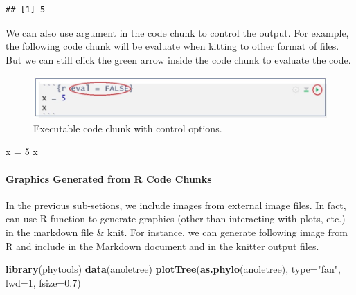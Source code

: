 \documentclass[
]{article}
\newenvironment{Shaded}{\begin{snugshade}}{\end{snugshade}}
\newcommand{\AttributeTok}[1]{\textcolor[rgb]{0.13,0.29,0.53}{#1}}
\newcommand{\DecValTok}[1]{\textcolor[rgb]{0.00,0.00,0.81}{#1}}
\newcommand{\FloatTok}[1]{\textcolor[rgb]{0.00,0.00,0.81}{#1}}
\newcommand{\FunctionTok}[1]{\textcolor[rgb]{0.13,0.29,0.53}{\textbf{#1}}}
\newcommand{\NormalTok}[1]{#1}
\newcommand{\OtherTok}[1]{\textcolor[rgb]{0.56,0.35,0.01}{#1}}
\newcommand{\StringTok}[1]{\textcolor[rgb]{0.31,0.60,0.02}{#1}}
\begin{document}
\begin{verbatim}
## [1] 5
\end{verbatim}

We can also use argument in the code chunk to control the output. For
example, the following code chunk will be evaluate when kitting to other
format of files. But we can still click the green arrow inside the code
chunk to evaluate the code.

\begin{figure}

{\centering \includegraphics[width=12.21in]{img/Executable-code-chunk-argument} 

}

\caption{Executable code chunk with control options.}\label{fig:unnamed-chunk-6}
\end{figure}

\begin{Shaded}
\begin{Highlighting}[]
\NormalTok{x }\OtherTok{=} \DecValTok{5}
\NormalTok{x}
\end{Highlighting}
\end{Shaded}

\hypertarget{graphics-generated-from-r-code-chunks}{%
\paragraph{Graphics Generated from R Code
Chunks}\label{graphics-generated-from-r-code-chunks}}

In the previous sub-setions, we include images from external image
files. In fact, can use R function to generate graphics (other than
interacting with plots, etc.) in the markdown file \& knit. For
instance, we can generate following image from R and include in the
Markdown document and in the knitter output files.

\begin{Shaded}
\begin{Highlighting}[]
\FunctionTok{library}\NormalTok{(phytools)}
\FunctionTok{data}\NormalTok{(anoletree)}
\FunctionTok{plotTree}\NormalTok{(}\FunctionTok{as.phylo}\NormalTok{(anoletree), }\AttributeTok{type=}\StringTok{"fan"}\NormalTok{, }\AttributeTok{lwd=}\DecValTok{1}\NormalTok{, }\AttributeTok{fsize=}\FloatTok{0.7}\NormalTok{)}
\end{Highlighting}
\end{Shaded}
\end{document}
